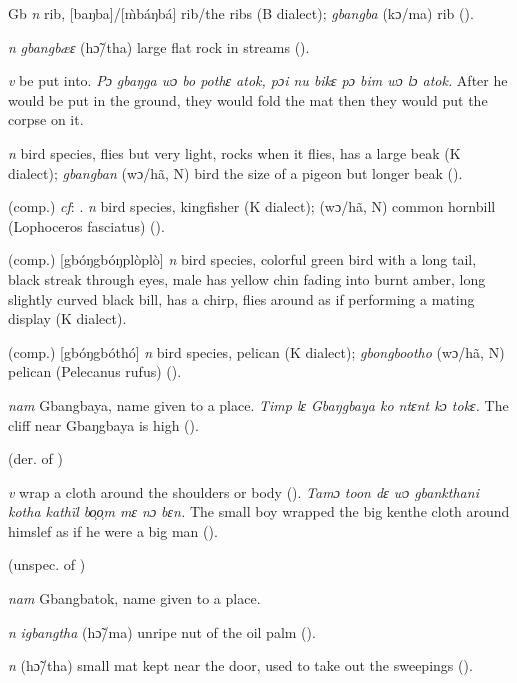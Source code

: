 \begin{letter}{Gb}
 \textit{n} rib, [baŋba]/[\`{m}báŋbá] rib/the ribs (B dialect); \textit{gbangba} (kɔ/ma) rib (\citealt{Pichl1967}). 

 \textit{n} \textit{gbangbæɛ} (hɔ̃/tha) large flat rock in streams (\citealt{Pichl1967}). 

 \textit{v} be put into. \textit{Pɔ gbaŋga wɔ bo pothɛ atok, pɔi nu bikɛ pɔ bim wɔ lɔ atok.} After he would be put in the ground, they would fold the mat then they would put the corpse on it.

 \textit{n} bird species, flies but very light, rocks when it flies, has a large beak (K dialect); \textit{gbangban} (wɔ/hã, N) bird the size of a pigeon but longer beak (\citealt{Pichl1967}). 

 (comp.) \textit{cf}: . \textit{n} bird species, kingfisher (K dialect); (wɔ/hã, N) common hornbill (Lophoceros fasciatus) (\citealt{Pichl1967}). 

 (comp.) [gbóŋgbóŋplòplò] \textit{n} bird species, colorful green bird with a long tail, black streak through eyes, male has yellow chin fading into burnt amber, long slightly curved black bill, has a chirp, flies around as if performing a mating display (K dialect). 

 (comp.) [gbóŋgbóthó] \textit{n} bird species, pelican (K dialect); \textit{gbongbootho} (wɔ/hã, N) pelican (Pelecanus rufus) (\citealt{Pichl1967}). 

 \textit{nam} Gbangbaya, name given to a place. \textit{Timp lɛ Gbaŋgbaya ko ntɛnt kɔ tokɛ.} The cliff near Gbaŋgbaya is high (\citealt{Pichl1967}). 

 (der. of )

 \textit{v} wrap a cloth around the shoulders or body (\citealt{Pichl1967}). \textit{Tamɔ toon dɛ wɔ gbankthani kotha kathïl bo̹o̹m mɛ nɔ bɛn.} The small boy wrapped the big kenthe cloth around himslef as if he were a big man (\citealt{Pichl1967}). 

 (unspec. of ) 

 \textit{nam} Gbangbatok, name given to a place. 

 \textit{n} \textit{igbangtha} (hɔ̃/ma) unripe nut of the oil palm (\citealt{Pichl1967}).

 \textit{n} (hɔ̃/tha) small mat kept near the door, used to take out the sweepings (\citealt{Pichl1967}). 


\end{letter}
